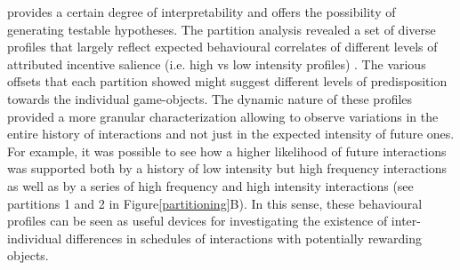 provides a certain degree of interpretability and offers the possibility of generating testable hypotheses. The partition analysis revealed a set of diverse profiles that largely reflect expected behavioural correlates of different levels of attributed incentive salience (i.e. high vs low intensity profiles) \cite{berridge2004motivation}. The various offsets that each partition showed might suggest different levels of predisposition towards the individual game-objects. The dynamic nature of these profiles provided a more granular characterization allowing to observe variations in the entire history of interactions and not just in the expected intensity of future ones. For example, it was possible to see how a higher likelihood of future interactions was supported both by a history of low intensity but high frequency interactions as well as by a series of high frequency and high intensity interactions (see partitions 1 and 2 in Figure\ref{partitioning}B). In this sense, these behavioural profiles can be seen as useful devices for investigating the existence of inter-individual differences in schedules of interactions with potentially rewarding objects.

